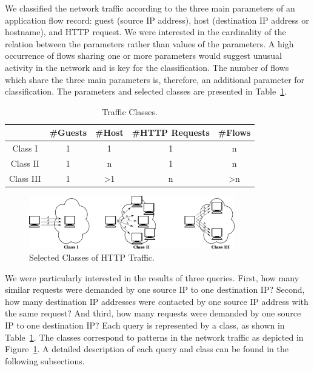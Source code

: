 We classified the network traffic according to the three main parameters of an application flow record: guest (source IP address), host (destination IP address or hostname), and HTTP request. We were interested in the cardinality of the relation between the parameters rather than values of the parameters. A high occurrence of flows sharing one or more parameters would suggest unusual activity in the network and is key for the classification. The number of flows which share the three main parameters is, therefore, an additional parameter for classification. The parameters and selected classes are presented in Table~\ref{tab:httpsecurity-classes}.

\begin{table}[ht]
\centering
\begin{tabular}{| c | c | c | c | c |} \hline
 &\#Guests & \#Host & \#HTTP Requests & \#Flows \\ \hline
Class I   & 1 &              1 & 1 & n \\ \hline
Class II  & 1 &              n & 1 & n \\ \hline
Class III & 1 & \textgreater 1 & n & \textgreater n \\ \hline
\end{tabular}
\caption{Traffic Classes.}
\label{tab:httpsecurity-classes}
\end{table}

\begin{figure}
  \centering
  \includegraphics[width=0.8\textwidth]{figures/paper-httpsecurity/classes}
  \caption{Selected Classes of HTTP Traffic.}
  \label{fig:httpsecurity-classes}
\end{figure}


We were particularly interested in the results of three queries. First, how many similar requests were demanded by one source IP to one destination IP? Second, how many destination IP addresses were contacted by one source IP address with the same request? And third, how many requests were demanded by one source IP to one destination IP? Each query is represented by a class, as shown in Table~\ref{tab:httpsecurity-classes}. The classes correspond to patterns in the network traffic as depicted in Figure~\ref{fig:httpsecurity-classes}. A detailed description of each query and class can be found in the following subsections.

